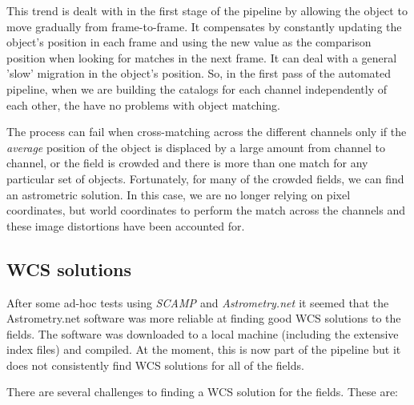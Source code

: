 This trend is dealt with in the first stage of the pipeline by allowing the object to move gradually from frame-to-frame. It compensates by  constantly updating the object's position in each frame and using the new value as the comparison position when looking for matches in the next frame. It can deal with a general 'slow' migration in the object's position. So, in the first pass of the automated pipeline, when we are building the catalogs for each channel independently of each other, the have no problems with object matching. 

The process can fail when cross-matching across the different channels only if the \emph{average} position of the object is displaced by a large amount from channel to channel, or the field is crowded and there is more than one match for any particular set of objects. Fortunately, for many of the crowded fields, we can find an astrometric solution. In this case, we are no longer relying on pixel coordinates, but world coordinates to perform the match across the channels and these image distortions have been accounted for. 

\subsection{WCS solutions}\label{sect:astrometry}

After some ad-hoc tests using \emph{SCAMP \cite{scamp}} and \emph{Astrometry.net \cite{astrometry}} it seemed that the Astrometry.net software was more reliable at finding good WCS solutions to the fields. The software was downloaded to a local machine (including the extensive index files) and compiled. At the moment, this is now part of the pipeline but it does not consistently find WCS solutions for all of the fields. 

There are several challenges to finding a WCS solution for the fields.  These are:

